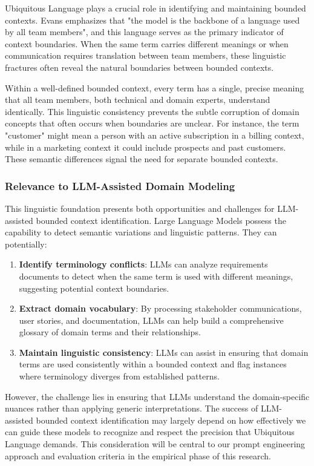 Ubiquitous Language plays a crucial role in identifying and maintaining bounded contexts. Evans \autocite[p.~13]{Evans2003} emphasizes that "the model is the backbone of a language used by all team members", and this language serves as the primary indicator of context boundaries. When the same term carries different meanings or when communication requires translation between team members, these linguistic fractures often reveal the natural boundaries between bounded contexts.

Within a well-defined bounded context, every term has a single, precise meaning that all team members, both technical and domain experts, understand identically. This linguistic consistency prevents the subtle corruption of domain concepts that often occurs when boundaries are unclear. For instance, the term "customer" might mean a person with an active subscription in a billing context, while in a marketing context it could include prospects and past customers. These semantic differences signal the need for separate bounded contexts.

\subsubsection{Relevance to LLM-Assisted Domain Modeling}
This linguistic foundation presents both opportunities and challenges for LLM-assisted bounded context identification. Large Language Models possess the capability to detect semantic variations and linguistic patterns. They can potentially:

\begin{enumerate}
    \item \textbf{Identify terminology conflicts}: LLMs can analyze requirements documents to detect when the same term is used with different meanings, suggesting potential context boundaries.
    
    \item \textbf{Extract domain vocabulary}: By processing stakeholder communications, user stories, and documentation, LLMs can help build a comprehensive glossary of domain terms and their relationships.
    
    \item \textbf{Maintain linguistic consistency}: LLMs can assist in ensuring that domain terms are used consistently within a bounded context and flag instances where terminology diverges from established patterns.
\end{enumerate}

However, the challenge lies in ensuring that LLMs understand the domain-specific nuances rather than applying generic interpretations. The success of LLM-assisted bounded context identification may largely depend on how effectively we can guide these models to recognize and respect the precision that Ubiquitous Language demands. This consideration will be central to our prompt engineering approach and evaluation criteria in the empirical phase of this research.

